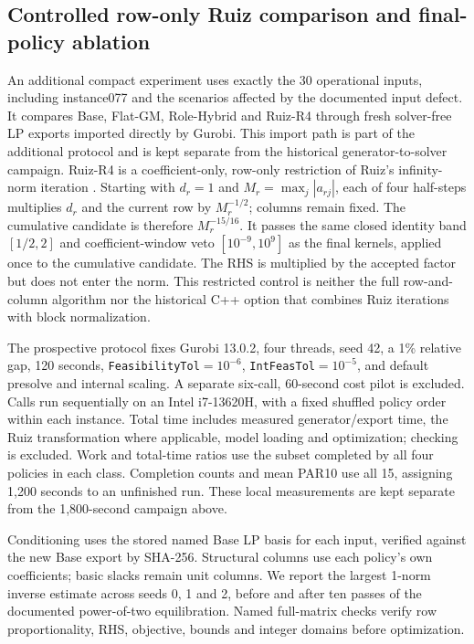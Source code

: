 \subsection{Controlled row-only Ruiz comparison and final-policy ablation}
\label{subsec:design-oms}
An additional compact experiment uses exactly the 30 operational inputs, including
instance077 and the scenarios affected by the documented input defect. It compares Base,
Flat-GM, Role-Hybrid and Ruiz-R4 through fresh solver-free LP exports imported directly
by Gurobi. This import path is part of the additional protocol and is kept separate from
the historical generator-to-solver campaign. Ruiz-R4 is
a coefficient-only, row-only restriction of Ruiz's
infinity-norm iteration \cite{ruiz2001scaling}. Starting with $d_r=1$ and
$M_r=\max_j|a_{rj}|$, each of four half-steps multiplies $d_r$ and the current row by
$M_r^{-1/2}$; columns remain fixed. The cumulative candidate is therefore
$M_r^{-15/16}$. It passes the same closed identity band $[1/2,2]$ and coefficient-window
veto $[10^{-9},10^9]$ as the final kernels, applied once to the cumulative candidate.
The RHS is multiplied by the accepted factor but does not enter the norm.
This restricted control is neither the full row-and-column algorithm nor the historical
C++ option that combines Ruiz iterations with block normalization.

The prospective protocol fixes Gurobi 13.0.2, four threads, seed 42, a 1\% relative gap,
120 seconds, \texttt{FeasibilityTol}$=10^{-6}$, \texttt{IntFeasTol}$=10^{-5}$,
and default presolve and internal scaling. A separate six-call, 60-second cost pilot is
excluded. Calls run sequentially on an Intel i7-13620H, with a fixed shuffled policy order
within each instance. Total time includes measured generator/export time, the Ruiz
transformation where applicable, model loading and optimization; checking is excluded.
Work and total-time ratios use the subset completed by all four policies in each class.
Completion counts and mean PAR10 use all 15, assigning 1,200 seconds to an unfinished run.
These local measurements are kept separate from the 1,800-second campaign above.

Conditioning uses the stored named Base LP basis for each input, verified against the
new Base export by SHA-256. Structural columns use each policy's own coefficients;
basic slacks remain unit columns. We report the largest 1-norm inverse estimate across
seeds 0, 1 and 2, before and after ten passes of the documented power-of-two
equilibration. Named full-matrix checks verify row proportionality, RHS, objective,
bounds and integer domains before optimization.

